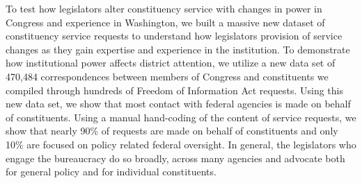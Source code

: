 \documentclass[12pt]{article}
\begin{document}




To test how legislators alter constituency service with changes in power in Congress and experience in Washington, we built a massive new dataset of constituency service requests to understand how legislators provision of service changes as they gain expertise and experience in the institution.  To demonstrate how institutional power affects district attention, we utilize a new data set of 470,484 correspondences between members of Congress and constituents we compiled through hundreds of Freedom of Information Act requests. Using this new data set, we show that most contact with federal agencies is made on behalf of constituents.  Using a manual hand-coding of the content of service requests, we show that nearly 90\% of requests are made on behalf of constituents and only 10\% are focused on policy related federal oversight.  In general, the legislators who engage the bureaucracy do so broadly, across many agencies and advocate both for general policy and for individual constituents.   

\end{document}
